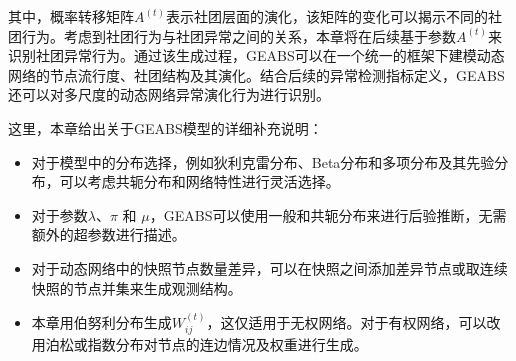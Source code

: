 其中，概率转移矩阵$A^{(t)}$表示社团层面的演化，该矩阵的变化可以揭示不同的社团行为。考虑到社团行为与社团异常之间的关系，本章将在后续基于参数$A^{(t)}$来识别社团异常行为。通过该生成过程，GEABS可以在一个统一的框架下建模动态网络的节点流行度、社团结构及其演化。结合后续的异常检测指标定义，GEABS还可以对多尺度的动态网络异常演化行为进行识别。

这里，本章给出关于GEABS模型的详细补充说明：
\begin{itemize}
    \item 对于模型中的分布选择，例如狄利克雷分布、Beta分布和多项分布及其先验分布，可以考虑共轭分布和网络特性进行灵活选择。
    \item  对于参数$\lambda$、$\pi$ 和 $\mu$，GEABS可以使用一般和共轭分布来进行后验推断，无需额外的超参数进行描述。
    \item  对于动态网络中的快照节点数量差异，可以在快照之间添加差异节点或取连续快照的节点并集来生成观测结构。
    \item  本章用伯努利分布生成$W^{(t)}_{ij}$，这仅适用于无权网络。对于有权网络，可以改用泊松或指数分布对节点的连边情况及权重进行生成。
\end{itemize}







